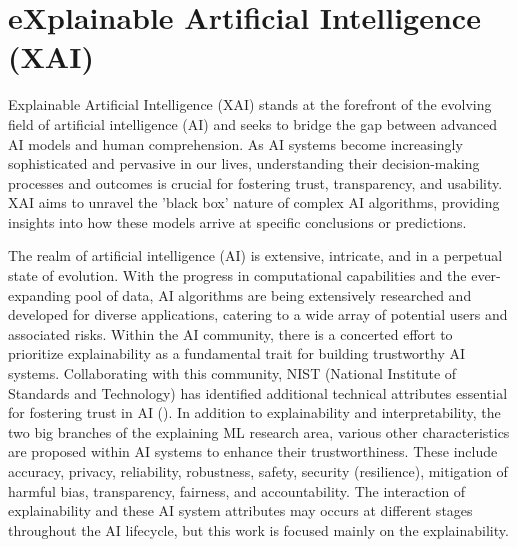 \documentclass[binding=0.6cm]{sapthesis}
\newcommand{\mycite}[1]{(\cite{#1})}
\begin{document}
\newpage
\section{eXplainable Artificial Intelligence (XAI)}
\label{sec:bg.xai}
Explainable Artificial Intelligence (XAI) stands at the forefront of the evolving field of artificial intelligence (AI) and seeks to bridge the gap between advanced AI models and human comprehension. As AI systems become increasingly sophisticated and pervasive in our lives, understanding their decision-making processes and outcomes is crucial for fostering trust, transparency, and usability. XAI aims to unravel the 'black box' nature of complex AI algorithms, providing insights into how these models arrive at specific conclusions or predictions.


The realm of artificial intelligence (AI) is extensive, intricate, and in a perpetual state of evolution. With the progress in computational capabilities and the ever-expanding pool of data, AI algorithms are being extensively researched and developed for diverse applications, catering to a wide array of potential users and associated risks. Within the AI community, there is a concerted effort to prioritize explainability as a fundamental trait for building trustworthy AI systems. Collaborating with this community, NIST (National Institute of Standards and Technology) has identified additional technical attributes essential for fostering trust in AI \mycite{phillips2021-nist-xai}. In addition to explainability and interpretability, the two big branches of the explaining ML research area, various other characteristics are proposed within AI systems to enhance their trustworthiness. These include accuracy, privacy, reliability, robustness, safety, security (resilience), mitigation of harmful bias, transparency, fairness, and accountability. The interaction of explainability and these AI system attributes may occurs at different stages throughout the AI lifecycle, but this work is focused mainly on the explainability.
\end{document}
